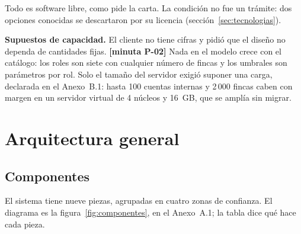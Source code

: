 \documentclass[11pt,letterpaper]{article}
\newcommand{\resp}[1]{\textrm{\footnotesize\bfseries [minuta #1]}}
\begin{document}
Todo es software libre, como pide la carta. La condición no fue un trámite: dos opciones conocidas se
descartaron por su licencia (sección~\ref{sec:tecnologias}).

\textbf{Supuestos de capacidad.} El cliente no tiene cifras y pidió que el diseño no dependa de cantidades
fijas. \resp{P-02} Nada en el modelo crece con el catálogo: los roles son siete con cualquier número
de fincas y los umbrales son parámetros por rol. Solo el tamaño del servidor exigió suponer una
carga, declarada en el Anexo~B.1: hasta 100 cuentas internas y 2\,000 fincas caben con margen en un
servidor virtual de 4 núcleos y 16~GB, que se amplía sin migrar.

\section{Arquitectura general}
\label{sec:arquitectura}

\subsection{Componentes}

El sistema tiene nueve piezas, agrupadas en cuatro zonas de confianza. El diagrama es la
figura~\ref{fig:componentes}, en el Anexo~A.1; la tabla dice qué hace cada pieza.
\end{document}
